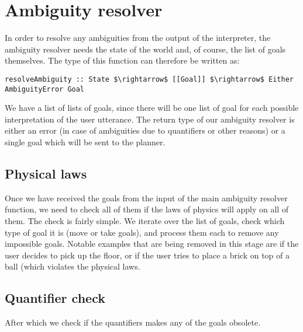 
\section*{Ambiguity resolver}
In order to resolve any ambiguities from the output of the interpreter, the ambiguity resolver needs the state of the world and, of course, the list of goals themselves.
The type of this function can therefore be written as:
\begin{lstlisting}
resolveAmbiguity :: State $\rightarrow$ [[Goal]] $\rightarrow$ Either AmbiguityError Goal
\end{lstlisting}

We have a list of lists of goals, since there will be one list of goal for each possible interpretation of the user utterance.
The return type of our ambiguity resolver is either an error (in case of ambiguities due to quantifiers or other reasons) or a single goal which will be sent to the planner.

\subsection*{Physical laws}
Once we have received the goals from the input of the main ambiguity resolver function, we need to check all of them if the laws of physics will apply on all of them.
The check is fairly simple.
We iterate over the list of goals, check which type of goal it is (move or take goals), and process them each to remove any impossible goals.
Notable examples that are being removed in this stage are if the user decides to pick up the floor, or if the user tries to place a brick on top of a ball (which violates the physical laws.

\subsection*{Quantifier check}
After which we check if the quantifiers makes any of the goals obsolete. %

